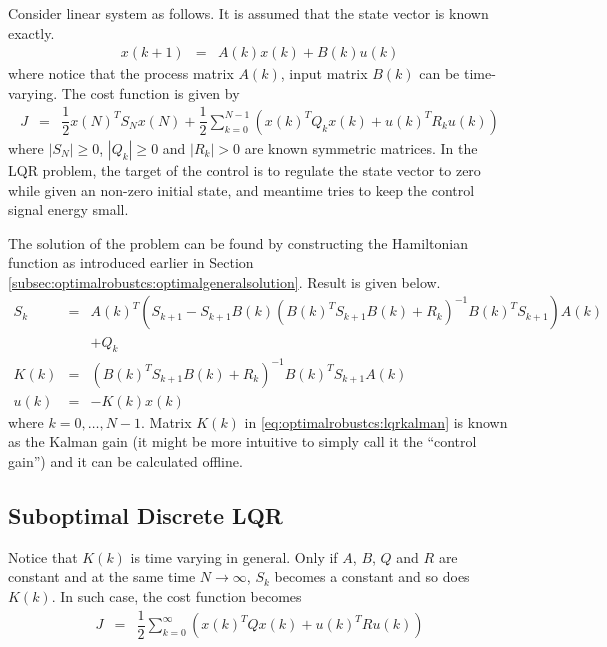 Consider linear system as follows. It is assumed that the state vector is known exactly.
\begin{eqnarray}
	x(k+1) &=& A(k)x(k) + B(k)u(k) \nonumber
\end{eqnarray}
where notice that the process matrix $A(k)$, input matrix $B(k)$ can be time-varying. The cost function is given by
\begin{eqnarray}
	J &=& \dfrac{1}{2}x(N)^TS_Nx(N) + \dfrac{1}{2}\sum_{k=0}^{N-1}\left(x(k)^TQ_kx(k) + u(k)^TR_ku(k)\right) \nonumber
\end{eqnarray}
where $|S_N|\geq 0$, $|Q_k| \geq 0$ and $|R_k| >0$ are known symmetric matrices. In the LQR problem, the target of the control is to regulate the state vector to zero while given an non-zero initial state, and meantime tries to keep the control signal energy small.

The solution of the problem can be found by constructing the Hamiltonian function as introduced earlier in Section \ref{subsec:optimalrobustcs:optimalgeneralsolution}. Result is given below.
\begin{eqnarray}
	S_k &=& A(k)^T\left(S_{k+1}-S_{k+1}B(k)\left(B(k)^TS_{k+1}B(k) + R_k\right)^{-1}B(k)^TS_{k+1}\right)A(k)  \nonumber \\ && + Q_k \label{eq:optimalrobustcs:srecursive} \\
	K(k) &=& \left(B(k)^TS_{k+1}B(k) + R_k\right)^{-1}B(k)^TS_{k+1}A(k) \label{eq:optimalrobustcs:lqrkalman} \\
	u(k) &=& -K(k)x(k) \nonumber
\end{eqnarray}
where $k=0,\ldots, N-1$. Matrix $K(k)$ in \eqref{eq:optimalrobustcs:lqrkalman} is known as the Kalman gain (it might be more intuitive to simply call it the ``control gain'') and it can be calculated offline.

\subsection{Suboptimal Discrete LQR} \label{subsec:suboptimaldiscretelqr}

Notice that $K(k)$ is time varying in general. Only if $A$, $B$, $Q$ and $R$ are constant and at the same time $N\rightarrow\infty$, $S_k$ becomes a constant and so does $K(k)$. In such case, the cost function becomes
\begin{eqnarray}
	J &=& \dfrac{1}{2}\sum_{k=0}^{\infty}\left(x(k)^TQx(k) + u(k)^TRu(k)\right) \nonumber
\end{eqnarray}

